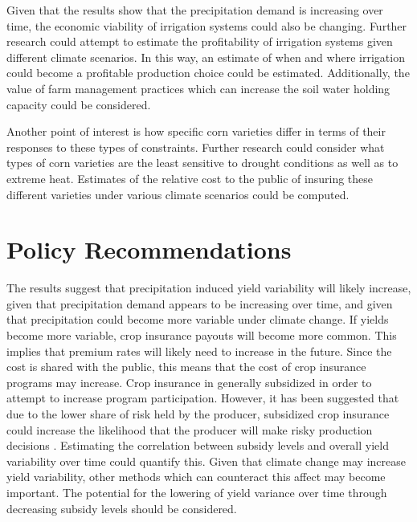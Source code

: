 Given that the results show that the precipitation demand is increasing over time, the economic viability of irrigation systems could also be changing. Further research could attempt to estimate the profitability of irrigation systems given different climate scenarios. In this way, an estimate of when and where irrigation could become a profitable production choice could be estimated. Additionally, the value of farm management practices which can increase the soil water holding capacity could be considered.

Another point of interest is how specific corn varieties differ in terms of their responses to these types of constraints. Further research could consider what types of corn varieties are the least sensitive to drought conditions as well as to extreme heat. Estimates of the relative cost to the public of insuring these different varieties under various climate scenarios could be computed. 

\section{Policy Recommendations}


The results suggest that precipitation induced yield variability will likely increase, given that precipitation demand appears to be increasing over time, and given that precipitation could become more variable under climate change. If yields become more variable, crop insurance payouts will become more common. This implies that premium rates will likely need to increase in the future. Since the cost is shared with the public, this means that the cost of crop insurance programs may increase. Crop insurance in generally subsidized in order to attempt to increase program participation. However, it has been suggested that due to the lower share of risk held by the producer, subsidized crop insurance could increase the likelihood that the producer will make risky production decisions \citep{kerRMP2016}. Estimating the correlation between subsidy levels and overall yield variability over time could quantify this. Given that climate change may increase yield variability, other methods which can counteract this affect may become important. The potential for the lowering of yield variance over time through decreasing subsidy levels should be considered. 


